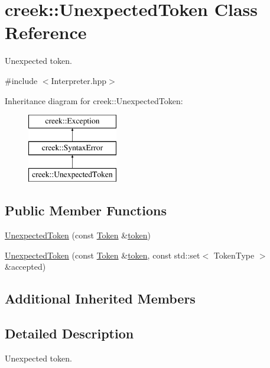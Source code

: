 \hypertarget{classcreek_1_1_unexpected_token}{}\section{creek\+:\+:Unexpected\+Token Class Reference}
\label{classcreek_1_1_unexpected_token}


Unexpected token.  




{\ttfamily \#include $<$Interpreter.\+hpp$>$}

Inheritance diagram for creek\+:\+:Unexpected\+Token\+:\begin{figure}[H]
\begin{center}
\leavevmode
\includegraphics[height=3.000000cm]{classcreek_1_1_unexpected_token}
\end{center}
\end{figure}
\subsection*{Public Member Functions}
\begin{DoxyCompactItemize}
\item 
\hyperlink{classcreek_1_1_unexpected_token_ad7473087a0b665a4be4cee9436f17564}{Unexpected\+Token} (const \hyperlink{classcreek_1_1_token}{Token} \&\hyperlink{classcreek_1_1_syntax_error_a5d8f72f338fd320cb76f9e1a875e2a35}{token})
\item 
\hyperlink{classcreek_1_1_unexpected_token_a1a9b3f7a09f42925dc75433f01d33bd2}{Unexpected\+Token} (const \hyperlink{classcreek_1_1_token}{Token} \&\hyperlink{classcreek_1_1_syntax_error_a5d8f72f338fd320cb76f9e1a875e2a35}{token}, const std\+::set$<$ Token\+Type $>$ \&accepted)
\end{DoxyCompactItemize}
\subsection*{Additional Inherited Members}


\subsection{Detailed Description}
Unexpected token. 

